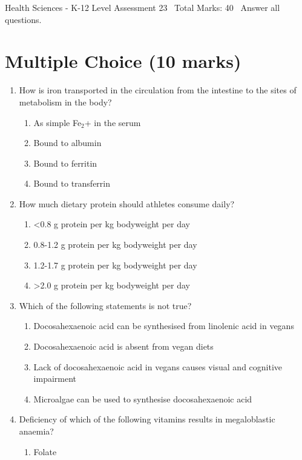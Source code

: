 \documentclass[12pt]{article}
\begin{document}
\begin{center}
Health Sciences - K-12 Level Assessment 23 \
Total Marks: 40 \
Answer all questions.
\end{center}

\section*{Multiple Choice (10 marks)}
\begin{enumerate}[label=\arabic*.]
\item How is iron transported in the circulation from the intestine to the sites of metabolism in the body?
\begin{enumerate}[label=(\alph*)]
    \item As simple Fe$_{2}$+ in the serum
    \item Bound to albumin
    \item Bound to ferritin
    \item Bound to transferrin
\end{enumerate}
\item How much dietary protein should athletes consume daily?
\begin{enumerate}[label=(\alph*)]
    \item \textless{}0.8 g protein per kg bodyweight per day
    \item 0.8-1.2 g protein per kg bodyweight per day
    \item 1.2-1.7 g protein per kg bodyweight per day
    \item \textgreater{}2.0 g protein per kg bodyweight per day
\end{enumerate}
\item Which of the following statements is not true?
\begin{enumerate}[label=(\alph*)]
    \item Docosahexaenoic acid can be synthesised from linolenic acid in vegans
    \item Docosahexaenoic acid is absent from vegan diets
    \item Lack of docosahexaenoic acid in vegans causes visual and cognitive impairment
    \item Microalgae can be used to synthesise docosahexaenoic acid
\end{enumerate}
\item Deficiency of which of the following vitamins results in megaloblastic anaemia?
\begin{enumerate}[label=(\alph*)]
    \item Folate

\end{enumerate}
\end{enumerate}
\end{document}
